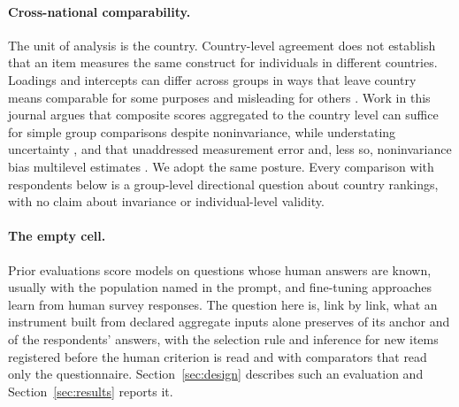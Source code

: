 \paragraph{Cross-national comparability.} The unit of analysis is the country. Country-level agreement does not establish that an item measures the same construct for individuals in different countries. Loadings and intercepts can differ across groups in ways that leave country means comparable for some purposes and misleading for others \citep{steenkamp1998,davidov2014}. Work in this journal argues that composite scores aggregated to the country level can suffice for simple group comparisons despite noninvariance, while understating uncertainty \citep{bratt2025}, and that unaddressed measurement error and, less so, noninvariance bias multilevel estimates \citep{pokropek2025}. We adopt the same posture. Every comparison with respondents below is a group-level directional question about country rankings, with no claim about invariance or individual-level validity.

\paragraph{The empty cell.} Prior evaluations score models on questions whose human answers are known, usually with the population named in the prompt, and fine-tuning approaches learn from human survey responses. The question here is, link by link, what an instrument built from declared aggregate inputs alone preserves of its anchor and of the respondents' answers, with the selection rule and inference for new items registered before the human criterion is read and with comparators that read only the questionnaire. Section~\ref{sec:design} describes such an evaluation and Section~\ref{sec:results} reports it.
